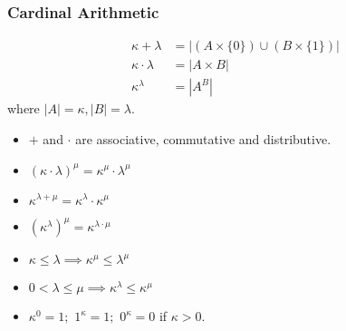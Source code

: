 \documentclass[UTF8,11pt,colorlinks,compress,openany]{beamer}%
\begin{document}
\begin{frame}\frametitle{Cardinal Arithmetic}
\setlength\abovedisplayskip{0pt}
\setlength\belowdisplayskip{0pt}
	\begin{definition}
		\begin{align*}
		\kappa+\lambda&=|\left(A\times\{0\}\right)\cup\left(B\times\{1\}\right)|\\
		\kappa\cdot\lambda&=|A\times B|\\
		\kappa^\lambda&=|A^B|
		\end{align*}
		where $|A|=\kappa, |B|=\lambda$.
	\end{definition}
	\begin{theorem}
		\begin{itemize}
			\item $+$ and $\cdot$ are associative, commutative and distributive.
			\item $(\kappa\cdot\lambda)^\mu=\kappa^\mu\cdot\lambda^\mu$
			\item $\kappa^{\lambda+\mu}=\kappa^\lambda\cdot\kappa^\mu$
			\item $(\kappa^\lambda)^\mu=\kappa^{\lambda\cdot\mu}$
			\item $\kappa\leq\lambda\implies\kappa^\mu\leq\lambda^\mu$
			\item $0<\lambda\leq\mu\implies\kappa^\lambda\leq\kappa^\mu$
			\item $\kappa^0=1;$ $1^\kappa=1;$ $0^\kappa=0$ if $\kappa>0$.
		\end{itemize}
	\end{theorem}
\end{frame}
\end{document}
